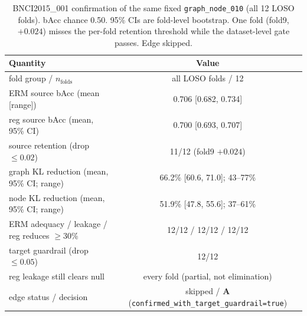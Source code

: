 \begin{table}[t]
\centering
\caption{BNCI2015\_001 confirmation of the same fixed \texttt{graph\_node\_010} (all 12 LOSO folds). bAcc
chance 0.50. 95\% CIs are fold-level bootstrap. One fold (fold9, $+0.024$) misses the per-fold retention
threshold while the dataset-level gate passes. Edge skipped.}
\label{tab:bnci2015}
\small
\begin{tabular}{lc}
\toprule
Quantity & Value \\
\midrule
fold group / $n_{\mathrm{folds}}$        & all LOSO folds / 12 \\
ERM source bAcc (mean [range])           & 0.706 [0.682, 0.734] \\
reg source bAcc (mean, 95\% CI)          & 0.700 [0.693, 0.707] \\
source retention (drop $\le 0.02$)       & 11/12 (fold9 $+0.024$) \\
graph KL reduction (mean, 95\% CI; range)& 66.2\% [60.6, 71.0]; 43--77\% \\
node KL reduction (mean, 95\% CI; range) & 51.9\% [47.8, 55.6]; 37--61\% \\
ERM adequacy / leakage / reg reduces $\ge$30\% & 12/12 / 12/12 / 12/12 \\
target guardrail (drop $\le 0.05$)       & 12/12 \\
reg leakage still clears null            & every fold (partial, not elimination) \\
edge status / decision                   & skipped / \textbf{A} (\texttt{confirmed\_with\_target\_guardrail=true}) \\
\bottomrule
\end{tabular}
\end{table}
